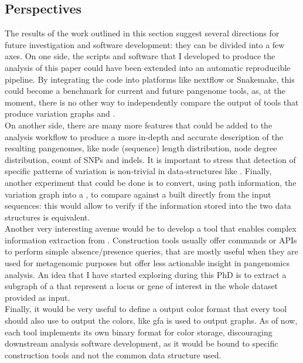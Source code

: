 \subsection{Perspectives}
The results of the work outlined in this section suggest several directions for future investigation and software development: they can be divided into a few axes.
On one side, the scripts and software that I developed to produce the analysis of this paper could have been extended into an automatic reproducible pipeline. By integrating the code into platforms like nextflow or Snakemake, this could become a benchmark for current and future pangenome tools, as, at the moment, there is no other way to independently compare the output of tools that produce variation graphs and \dbgs. \\
On another side, there are many more features that could be added to the analysis workflow to produce a more in-depth and accurate description of the resulting pangenomes, like node (sequence) length distribution, node degree distribution, count of SNPs and indels. It is important to stress that detection of specific patterns of variation is non-trivial in data-structures like \dbgs. Finally, another experiment that could be done is to convert, using path information, the variation graph into a \ccdbg, to compare against a \ccdbg built directly from the input sequences: this would allow to verify if the information stored into the two data structures is equivalent. \\
Another very interesting avenue would be to develop a tool that enables complex information extraction from \ccdbgs. Construction tools usually offer commands or APIs to perform simple absence/presence queries, that are mostly useful when they are used for metagenomic purposes but offer less actionable insight in pangenomics analysis. An idea that I have started exploring during this PhD is to extract a subgraph of a \ccdbg that represent a locus or gene of interest in the whole dataset provided as input. \\ 
Finally, it would be very useful to define a \ccdbg output color format that every tool should also use to output the colors, like gfa is used to output graphs. As of now, each tool implements its own binary format for color storage, discouraging downstream analysis software development, as it would be bound to specific construction tools and not the common data structure used.

\newpage

